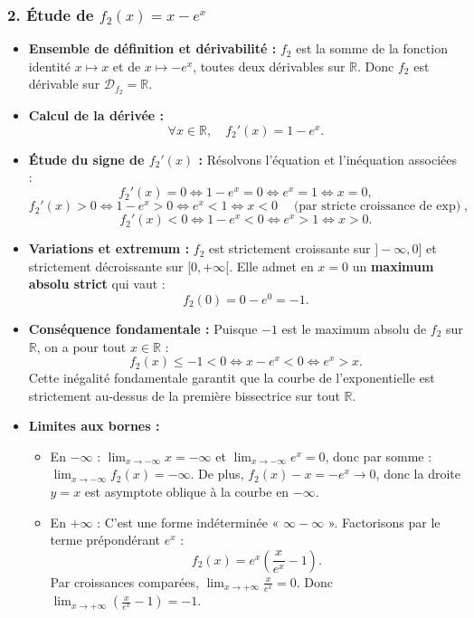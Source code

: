 \documentclass[11pt,a4paper]{article}
\newcommand{\R}{\mathbb{R}}
\begin{document}
\begin{correctionbox}[Exercice 3]
\subsubsection*{2. Étude de $f_2(x) = x - e^x$}
\begin{itemize}
    \item \textbf{Ensemble de définition et dérivabilité :}
    $f_2$ est la somme de la fonction identité $x \mapsto x$ et de $x \mapsto -e^x$, toutes deux dérivables sur $\R$. Donc $f_2$ est dérivable sur $\mathcal{D}_{f_2} = \R$.
    \item \textbf{Calcul de la dérivée :}
    \[
    \forall x \in \R, \quad f_2'(x) = 1 - e^x.
    \]
    \item \textbf{Étude du signe de $f_2'(x)$ :}
    Résolvons l'équation et l'inéquation associées :
    \[
    f_2'(x) = 0 \iff 1 - e^x = 0 \iff e^x = 1 \iff x = 0,
    \]
    \[
    f_2'(x) > 0 \iff 1 - e^x > 0 \iff e^x < 1 \iff x < 0 \quad \text{(par stricte croissance de $\exp$)},
    \]
    \[
    f_2'(x) < 0 \iff 1 - e^x < 0 \iff e^x > 1 \iff x > 0.
    \]
    \item \textbf{Variations et extremum :}
    $f_2$ est strictement croissante sur $]-\infty, 0]$ et strictement décroissante sur $[0, +\infty[$.
    Elle admet en $x = 0$ un \textbf{maximum absolu strict} qui vaut :
    \[
    f_2(0) = 0 - e^0 = -1.
    \]
    \item \textbf{Conséquence fondamentale :}
    Puisque $-1$ est le maximum absolu de $f_2$ sur $\R$, on a pour tout $x \in \R$ :
    \[
    f_2(x) \le -1 < 0 \iff x - e^x < 0 \iff e^x > x.
    \]
    Cette inégalité fondamentale garantit que la courbe de l'exponentielle est strictement au-dessus de la première bissectrice sur tout $\R$.
    \item \textbf{Limites aux bornes :}
    \begin{itemize}
        \item En $-\infty$ : $\lim_{x \to -\infty} x = -\infty$ et $\lim_{x \to -\infty} e^x = 0$, donc par somme : $\lim_{x \to -\infty} f_2(x) = -\infty$. De plus, $f_2(x) - x = -e^x \to 0$, donc la droite $y = x$ est asymptote oblique à la courbe en $-\infty$.
        \item En $+\infty$ : C'est une forme indéterminée « $\infty - \infty$ ». Factorisons par le terme prépondérant $e^x$ :
        \[
        f_2(x) = e^x \left(\frac{x}{e^x} - 1\right).
        \]
        Par croissances comparées, $\lim_{x \to +\infty} \frac{x}{e^x} = 0$. Donc $\lim_{x \to +\infty} \left(\frac{x}{e^x} - 1\right) = -1$.

\end{itemize}
\end{itemize}
\end{correctionbox}
\end{document}
